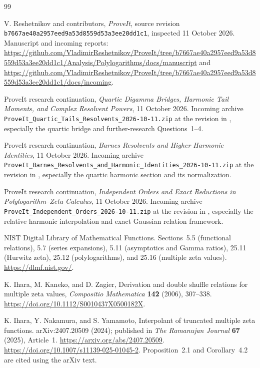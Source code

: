 \begin{thebibliography}{99}
\raggedright

V. Reshetnikov and contributors,
\emph{ProveIt}, source revision
\texttt{b7667ae40a2957eed9a53d8559d53a3ee20dd1c1},
inspected 11 October 2026.
Manuscript and incoming reports:
\url{https://github.com/VladimirReshetnikov/ProveIt/tree/b7667ae40a2957eed9a53d8559d53a3ee20dd1c1/Analysis/Polylogarithms/docs/manuscript}
and
\url{https://github.com/VladimirReshetnikov/ProveIt/tree/b7667ae40a2957eed9a53d8559d53a3ee20dd1c1/docs/incoming}.

ProveIt research continuation,
\emph{Quartic Digamma Bridges, Harmonic Tail Moments, and Complex
Resolvent Powers}, 11 October 2026.
Incoming archive
\texttt{ProveIt\_Quartic\_Tails\_Resolvents\_2026-10-11.zip}
at the revision in \cite{Repo}, especially the quartic bridge
and further-research Questions~1--4.

ProveIt research continuation,
\emph{Barnes Resolvents and Higher Harmonic Identities},
11 October 2026.
Incoming archive
\texttt{ProveIt\_Barnes\_Resolvents\_and\_Harmonic\_Identities\_2026-10-11.zip}
at the revision in \cite{Repo}, especially the quartic harmonic
section and its normalization.

ProveIt research continuation,
\emph{Independent Orders and Exact Reductions in
Polylogarithm--Zeta Calculus}, 11 October 2026.
Incoming archive
\texttt{ProveIt\_Independent\_Orders\_2026-10-11.zip}
at the revision in \cite{Repo}, especially the relative
harmonic interpolation and exact Gaussian relation framework.

NIST Digital Library of Mathematical Functions.
Sections~5.5 (functional relations), 5.7 (series expansions),
5.11 (asymptotics and Gamma ratios), 25.11 (Hurwitz zeta),
25.12 (polylogarithms), and 25.16 (multiple zeta values).
\url{https://dlmf.nist.gov/}.

K. Ihara, M. Kaneko, and D. Zagier,
Derivation and double shuffle relations for multiple zeta values,
\emph{Compositio Mathematica} \textbf{142} (2006), 307--338.
\url{https://doi.org/10.1112/S0010437X0500182X}.

K. Ihara, Y. Nakamura, and S. Yamamoto,
Interpolant of truncated multiple zeta functions.
arXiv:2407.20509 (2024); published in
\emph{The Ramanujan Journal} \textbf{67} (2025), Article~1.
\url{https://arxiv.org/abs/2407.20509}.
\url{https://doi.org/10.1007/s11139-025-01045-2}.
Proposition~2.1 and Corollary~4.2 are cited using the arXiv text.


\end{thebibliography}
